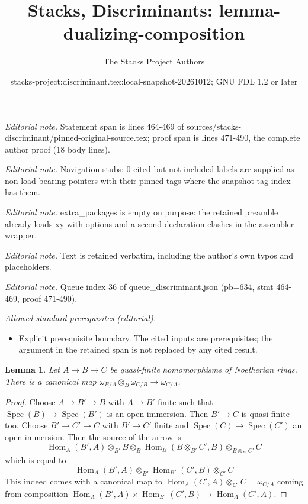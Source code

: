 \documentclass[10pt,a4paper]{amsart}
\title{Stacks, Discriminants: lemma-dualizing-composition}
\author{The Stacks Project Authors}
\date{stacks-project:discriminant.tex:local-snapshot-20261012; GNU FDL 1.2 or later}
\theoremstyle{plain}
\newtheorem{lemma}[subsection]{Lemma}
\theoremstyle{definition}
\theoremstyle{remark}
\numberwithin{equation}{subsection}
\def\Spec{\mathop{\mathrm{Spec}}}
\def\Hom{\mathop{\mathrm{Hom}}\nolimits}
\begin{document}
\maketitle
\noindent\textit{Editorial note.} Statement span is lines 464-469 of sources/stacks-discriminant/pinned-original-source.tex; proof span is lines 471-490, the complete author proof (18 body lines).\par\medskip
\noindent\textit{Editorial note.} Navigation stubs: 0 cited-but-not-included labels are supplied as non-load-bearing pointers with their pinned tags where the snapshot tag index has them.\par\medskip
\noindent\textit{Editorial note.} extra\_packages is empty on purpose: the retained preamble already loads xy with options and a second declaration clashes in the assembler wrapper.\par\medskip
\noindent\textit{Editorial note.} Text is retained verbatim, including the author's own typos and placeholders.\par\medskip
\noindent\textit{Editorial note.} Queue index 36 of queue\_discriminant.json (pb=634, stmt 464-469, proof 471-490).\par\medskip
\noindent\textit{Allowed standard prerequisites (editorial).}\begin{itemize}
\item Explicit prerequisite boundary. The cited inputs are prerequisites; the argument in the retained span is not replaced by any cited result.
\end{itemize}\medskip
\begin{lemma}
\label{lemma-dualizing-composition}
Let $A \to B \to C$ be quasi-finite homomorphisms of Noetherian rings.
There is a canonical map
$\omega_{B/A} \otimes_B \omega_{C/B} \to \omega_{C/A}$.
\end{lemma}

\begin{proof}
Choose $A \to B' \to B$ with $A \to B'$ finite such that
$\Spec(B) \to \Spec(B')$ is an open immersion. Then
$B' \to C$ is quasi-finite too. Choose $B' \to C' \to C$
with $B' \to C'$ finite and $\Spec(C) \to \Spec(C')$ an
open immersion. Then the source of the arrow is
$$
\Hom_A(B', A) \otimes_{B'} B \otimes_B
\Hom_B(B \otimes_{B'} C', B) \otimes_{B \otimes_{B'} C'} C
$$
which is equal to
$$
\Hom_A(B', A) \otimes_{B'}
\Hom_{B'}(C', B) \otimes_{C'} C
$$
This indeed comes with a canonical map to
$\Hom_A(C', A) \otimes_{C'} C = \omega_{C/A}$
coming from composition
$\Hom_A(B', A) \times \Hom_{B'}(C', B) \to \Hom_A(C', A)$.
\end{proof}
\end{document}
